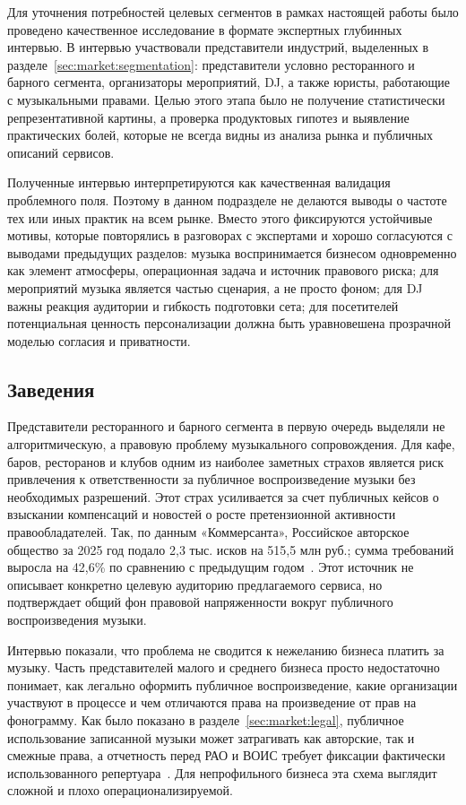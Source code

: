 Для уточнения потребностей целевых сегментов в рамках настоящей работы было проведено качественное исследование в формате экспертных глубинных интервью. В интервью участвовали представители индустрий, выделенных в разделе~\ref{sec:market:segmentation}: представители условно ресторанного и барного сегмента, организаторы мероприятий, DJ, а также юристы, работающие с музыкальными правами. Целью этого этапа было не получение статистически репрезентативной картины, а проверка продуктовых гипотез и выявление практических болей, которые не всегда видны из анализа рынка и публичных описаний сервисов.

Полученные интервью интерпретируются как качественная валидация проблемного поля. Поэтому в данном подразделе не делаются выводы о частоте тех или иных практик на всем рынке. Вместо этого фиксируются устойчивые мотивы, которые повторялись в разговорах с экспертами и хорошо согласуются с выводами предыдущих разделов: музыка воспринимается бизнесом одновременно как элемент атмосферы, операционная задача и источник правового риска; для мероприятий музыка является частью сценария, а не просто фоном; для DJ важны реакция аудитории и гибкость подготовки сета; для посетителей потенциальная ценность персонализации должна быть уравновешена прозрачной моделью согласия и приватности.

\subsection{Заведения}
\label{subsec:market:needs-business}

Представители ресторанного и барного сегмента в первую очередь выделяли не алгоритмическую, а правовую проблему музыкального сопровождения. Для кафе, баров, ресторанов и клубов одним из наиболее заметных страхов является риск привлечения к ответственности за публичное воспроизведение музыки без необходимых разрешений. Этот страх усиливается за счет публичных кейсов о взыскании компенсаций и новостей о росте претензионной активности правообладателей. Так, по данным «Коммерсанта», Российское авторское общество за 2025 год подало 2,3 тыс. исков на 515,5 млн руб.; сумма требований выросла на 42,6\% по сравнению с предыдущим годом~\cite{kommersant_rao_claims_2026}. Этот источник не описывает конкретно целевую аудиторию предлагаемого сервиса, но подтверждает общий фон правовой напряженности вокруг публичного воспроизведения музыки.

Интервью показали, что проблема не сводится к нежеланию бизнеса платить за музыку. Часть представителей малого и среднего бизнеса просто недостаточно понимает, как легально оформить публичное воспроизведение, какие организации участвуют в процессе и чем отличаются права на произведение от прав на фонограмму. Как было показано в разделе~\ref{sec:market:legal}, публичное использование записанной музыки может затрагивать как авторские, так и смежные права, а отчетность перед РАО и ВОИС требует фиксации фактически использованного репертуара~\cite{rao_report_forms,vois_report_form}. Для непрофильного бизнеса эта схема выглядит сложной и плохо операционализируемой.

